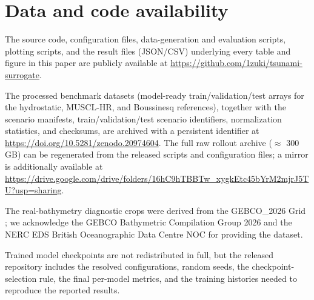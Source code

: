 \section*{Data and code availability}
The source code, configuration files, data-generation and evaluation scripts, plotting scripts, and the result files (JSON/CSV) underlying every table and figure in this paper are publicly available at \url{https://github.com/1zuki/tsunami-surrogate}.

The processed benchmark datasets (model-ready train/validation/test arrays for the hydrostatic, MUSCL-HR, and Boussinesq references), together with the scenario manifests, train/validation/test scenario identifiers, normalization statistics, and checksums, are archived with a persistent identifier at \url{https://doi.org/10.5281/zenodo.20974604}. The full raw rollout archive ($\approx$ 300\,GB) can be regenerated from the released scripts and configuration files; a mirror is additionally available at \url{https://drive.google.com/drive/folders/16hC9hTBBTw_xygkEtc45bYrM2mjrJ5TU?usp=sharing}.

The real-bathymetry diagnostic crops were derived from the GEBCO\_2026 Grid \citep{gebco2026}; we acknowledge the GEBCO Bathymetric Compilation Group 2026 and the NERC EDS British Oceanographic Data Centre NOC for providing the dataset.

Trained model checkpoints are not redistributed in full, but the released
repository includes the resolved configurations, random seeds, the checkpoint-selection rule, the final per-model metrics, and the training histories needed to reproduce the reported results.

